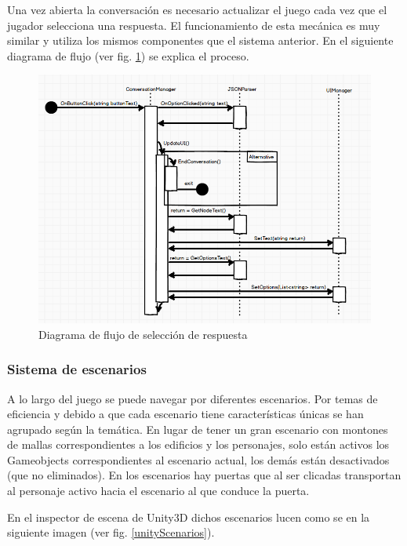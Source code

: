 Una vez abierta la conversación es necesario actualizar el juego cada vez que el jugador selecciona una respuesta. El funcionamiento de esta mecánica es muy similar y utiliza los mismos componentes que el sistema anterior.
En el siguiente diagrama de flujo (ver fig. \ref{respuestaFlujo}) se explica el proceso.

\begin{figure}[H]
\begin{center}
\includegraphics[scale=0.55]{imagenes/respuestaFlujo.png}
\caption{Diagrama de flujo de selección de respuesta}
\label{respuestaFlujo}
\end{center}
\end{figure}

\subsubsection{Sistema de escenarios}

A lo largo del juego se puede navegar por diferentes escenarios. Por temas de eficiencia y debido a que cada escenario tiene características únicas se han agrupado según la temática. En lugar de tener un gran escenario con montones de mallas correspondientes a los edificios y los personajes, solo están activos los Gameobjects correspondientes al escenario actual, los demás están desactivados (que no eliminados). En los escenarios hay puertas que al ser clicadas transportan al personaje activo hacia el escenario al que conduce la puerta. 

En el inspector de escena de Unity3D dichos escenarios lucen como se en la siguiente imagen (ver fig. \ref{unityScenarios}).


